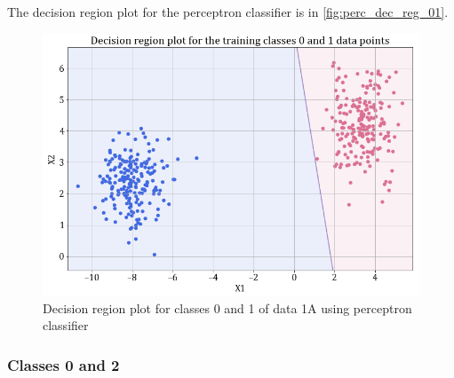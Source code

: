 \documentclass[11pt,a4paper]{article}
\newcommand{\noi}{\noindent}
\begin{document}
\noi
The decision region plot for the perceptron classifier is in \autoref{fig:perc_dec_reg_01}.
\begin{figure}[H]
    \centering
    \includegraphics[scale=0.45]{images/1A_perceptron_training_classes_0_and_1_dec_reg.png}
    \caption{Decision region plot for classes 0 and 1 of data 1A using perceptron classifier}
    \label{fig:perc_dec_reg_01}
\end{figure}

\subsubsection{Classes 0 and 2}

\end{document}
